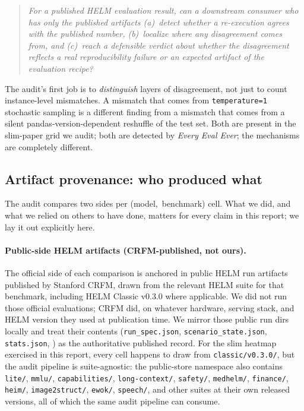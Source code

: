 \documentclass[11pt]{article}
\newcommand{\eee}{\textit{Every Eval Ever}\xspace}
\begin{document}
\begin{quote}\itshape
For a published HELM evaluation result, can a downstream consumer who
  has only the published artifacts (a)~detect whether a re-execution
  agrees with the published number, (b)~localize where any
  disagreement comes from, and (c)~reach a defensible verdict about
  whether the disagreement reflects a real reproducibility failure or
  an expected artifact of the evaluation recipe?
\end{quote}

The audit's first job is to \emph{distinguish} layers of disagreement,
  not just to count instance-level mismatches.
A mismatch that comes from \texttt{temperature=1} stochastic sampling
  is a different finding from a mismatch that comes from a silent
  pandas-version-dependent reshuffle of the test set.
Both are present in the slim-paper grid we audit; both are detected
  by \eee{}; the mechanisms are completely different.

\subsection{Artifact provenance: who produced what}
\label{sec:tr-artifact-provenance}

The audit compares two sides per \mbox{(model, benchmark)} cell.
What we did, and what we relied on others to have done, matters for
  every claim in this report; we lay it out explicitly here.

\paragraph{Public-side HELM artifacts (CRFM-published, not ours).}
The official side of each comparison is anchored in public HELM run
  artifacts published by Stanford CRFM, drawn from the relevant
  HELM suite for that benchmark, including HELM Classic v0.3.0 where
  applicable.
We did not run those official evaluations; CRFM did, on whatever
  hardware, serving stack, and HELM version they used at publication
  time.
We mirror those public run dirs locally and treat their contents
  (\texttt{run\_spec.json}, \texttt{scenario\_state.json},
  \texttt{stats.json}, ) as the
  authoritative published record.
For the slim heatmap exercised in this report, every cell happens to
  draw from \texttt{classic/v0.3.0/}, but the audit pipeline is
  suite-agnostic: the public-store namespace also contains
  \texttt{lite/}, \texttt{mmlu/}, \texttt{capabilities/},
  \texttt{long-context/}, \texttt{safety/}, \texttt{medhelm/},
  \texttt{finance/}, \texttt{heim/}, \texttt{image2struct/},
  \texttt{ewok/}, \texttt{speech/}, and other suites at their own
  released versions, all of which the same audit pipeline can
  consume.
\end{document}
